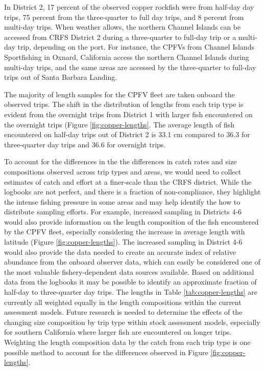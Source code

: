 \documentclass[11pt,
  english,
  letterpaper,
]{article}
\begin{document}
In District 2, 17 percent of the observed copper rockfish were from half-day day trips, 75 percent from the three-quarter to full day trips, and 8 percent from multi-day trips. When weather allows, the northern Channel Islands can be accessed from CRFS District 2 during a three-quarter to full-day trip or a multi-day trip, depending on the port. For instance, the CPFVs from Channel Islands Sportfishing in Oxnard, California access the northern Channel Islands during multi-day trips, and the same areas are accessed by the three-quarter to full-day trips out of Santa Barbara Landing.

The majority of length samples for the CPFV fleet are taken onboard the observed trips. The shift in the distribution of lengths from each trip type is evident from the overnight trips from District 1 with larger fish encountered on the overnight trips (Figure \ref{fig:copper-lengths}. The average length of fish encountered on half-day trips out of District 2 is 33.1 cm compared to 36.3 for three-quarter day trips and 36.6 for overnight trips.

To account for the differences in the the differences in catch rates and size compositions observed across trip types and areas, we would need to collect estimates of catch and effort at a finer-scale than the CRFS district. While the logbooks are not perfect, and there is a fraction of non-compliance, they highlight the intense fishing pressure in some areas and may help identify the how to distribute sampling efforts. For example, increased sampling in Districts 4-6 would also provide information on the length composition of the fish encountered by the CPFV fleet, especially considering the increase in average length with latitude (Figure \ref{fig:copper-lengths}). The increased sampling in District 4-6 would also provide the data needed to create an accurate index of relative abundance from the onboard observer data, which can easily be considered one of the most valuable fishery-dependent data sources available. Based on additional data from the logbooks it may be possible to identify an approximate fraction of half-day to three-quarter day trips. The lengths in Table \ref{tab:copper-lengths} are currently all weighted equally in the length compositions within the current assessment models. Future research is needed to determine the effects of the changing size composition by trip type within stock assessment models, especially for southern California where larger fish are encountered on longer trips. Weighting the length composition data by the catch from each trip type is one possible method to account for the differences observed in Figure \ref{fig:copper-lengths}.
\end{document}
